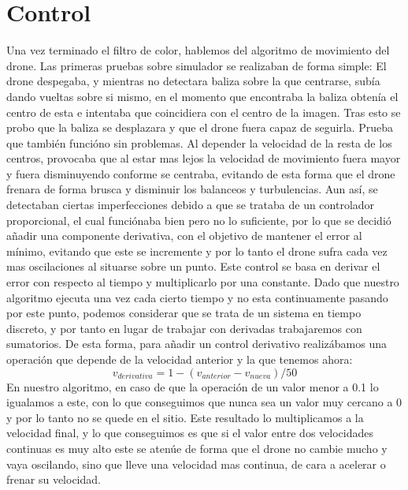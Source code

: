 \section{Control}
\label{sec.control}
\hspace{1cm} Una vez terminado el filtro de color, hablemos del algoritmo de movimiento del drone. Las primeras pruebas sobre simulador se realizaban de forma simple: El drone despegaba, y mientras no detectara baliza sobre la que centrarse, sub\'ia dando vueltas sobre si mismo, en el momento que encontraba la baliza obten\'ia el centro de esta e intentaba que coincidiera con el centro de la imagen. Tras esto se probo que la baliza se desplazara y que el drone fuera capaz de seguirla. Prueba que tambi\'en funci\'ono sin problemas. Al depender la velocidad de la resta de los centros, provocaba que al estar mas lejos la velocidad de movimiento fuera mayor y fuera disminuyendo conforme se centraba, evitando de esta forma que el drone frenara de forma brusca y disminuir los balanceos y turbulencias. 
Aun as\'i, se detectaban ciertas imperfecciones debido a que se trataba de un controlador proporcional, el cual funci\'onaba bien pero no lo suficiente, por lo que se decidi\'o añadir una componente derivativa, con el objetivo de mantener el error al m\'inimo, evitando que este se incremente y por lo tanto el drone sufra cada vez mas oscilaciones al situarse sobre un punto. Este control se basa en derivar el error con respecto al tiempo y multiplicarlo por una constante. Dado que nuestro algoritmo ejecuta una vez cada cierto tiempo y no esta continuamente pasando por este punto, podemos considerar que se trata de un sistema en tiempo discreto, y por tanto en lugar de trabajar con derivadas trabajaremos con sumatorios. De esta forma, para añadir un control derivativo realiz\'abamos una operaci\'on que depende de la velocidad anterior y la que tenemos ahora: \[v_{derivativa} =1-(v_{anterior}-v_{nueva})/50 \]  
\hspace{1cm} En nuestro algoritmo, en caso de que la operaci\'on de un valor menor a 0.1 lo igualamos a este, con lo que conseguimos que nunca sea un valor muy cercano a 0 y por lo tanto no se quede en el sitio. Este resultado lo multiplicamos a la velocidad final, y lo que conseguimos es que si el valor entre dos velocidades continuas es muy alto este se aten\'ue de forma que el drone no cambie mucho y vaya oscilando, sino que lleve una velocidad mas continua, de cara a acelerar o frenar su velocidad. 

